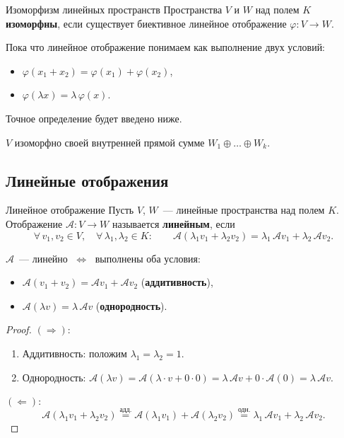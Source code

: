 \begin{Definition}{Изоморфизм линейных пространств}{}
	Пространства $V$ и $W$ над полем $K$ \textbf{изоморфны}, если существует
	биективное линейное отображение $\varphi \colon V \longrightarrow W$.
\end{Definition}

\begin{remark}
	Пока что линейное отображение понимаем как выполнение двух условий:
	\begin{itemize}
		\item $\varphi(x_1 + x_2) = \varphi(x_1) + \varphi(x_2)$,
		\item $\varphi(\lambda x) = \lambda\,\varphi(x)$.
	\end{itemize}
	Точное определение будет введено ниже.
\end{remark}

\begin{Corollary}{}{}
	$V$ изоморфно своей внутренней прямой сумме $W_1 \oplus \ldots \oplus W_k$.
\end{Corollary}

\subsection{Линейные отображения}

\begin{Definition}{Линейное отображение}{}
	Пусть $V$, $W$~--- линейные пространства над полем $K$.
	Отображение $\mathcal{A} \colon V \longrightarrow W$ называется \textbf{линейным}, если
	\[
	\forall\, v_1, v_2 \in V,\quad \forall\, \lambda_1, \lambda_2 \in K \colon
	\qquad
	\mathcal{A}(\lambda_1 v_1 + \lambda_2 v_2) = \lambda_1\,\mathcal{A}v_1 + \lambda_2\,\mathcal{A}v_2.
	\]
\end{Definition}

\begin{Proposition}{}{}
	$\mathcal{A}$~--- линейно $\;\Longleftrightarrow\;$ выполнены оба условия:
	\begin{itemize}
		\item $\mathcal{A}(v_1 + v_2) = \mathcal{A}v_1 + \mathcal{A}v_2$ \quad (\textbf{аддитивность}),
		\item $\mathcal{A}(\lambda v) = \lambda\,\mathcal{A}v$ \quad (\textbf{однородность}).
	\end{itemize}
\end{Proposition}

\begin{proof}
	$(\Rightarrow)$:
	\begin{enumerate}
		\item Аддитивность: положим $\lambda_1 = \lambda_2 = 1$.
		\item Однородность: $\mathcal{A}(\lambda v) = \mathcal{A}(\lambda \cdot v + 0 \cdot 0) = \lambda\,\mathcal{A}v + 0\cdot\mathcal{A}(0) = \lambda\,\mathcal{A}v$.
	\end{enumerate}
	
	$(\Leftarrow)$:
	\[
	\mathcal{A}(\lambda_1 v_1 + \lambda_2 v_2)
	\overset{\text{адд.}}{=} \mathcal{A}(\lambda_1 v_1) + \mathcal{A}(\lambda_2 v_2)
	\overset{\text{одн.}}{=} \lambda_1\,\mathcal{A}v_1 + \lambda_2\,\mathcal{A}v_2.
	\]
\end{proof}

